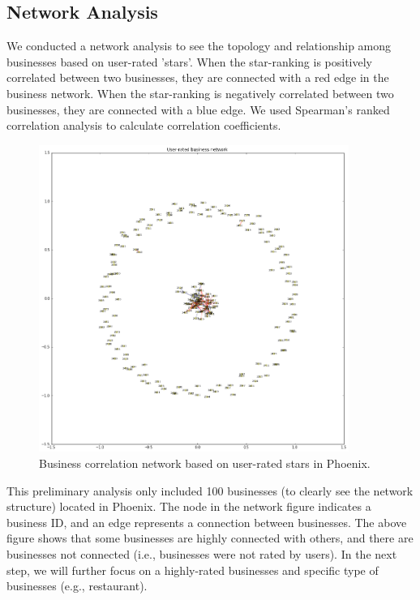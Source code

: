 \documentclass[11pt]{article}
\begin{document}
\subsection*{Network Analysis}
\par We conducted a network analysis to see the topology and relationship among businesses based on user-rated 'stars'. When the star-ranking is positively correlated between two businesses, they are connected with a red edge in the business network. When the star-ranking is negatively correlated between two businesses, they are connected with a blue edge. We used Spearman's ranked correlation analysis to calculate correlation coefficients.
\begin{figure}[H]
\centering
\includegraphics[width=0.9\textwidth]{./ac209/networkanalysis.png}
\caption{Business correlation network based on user-rated stars in Phoenix.}
\end{figure}
\par This preliminary analysis only included 100 businesses (to clearly see the network structure) located in Phoenix. The node in the network figure indicates a business ID, and an edge represents a connection between businesses. The above figure shows that some businesses are highly connected with others, and there are businesses not connected (i.e., businesses were not rated by users). In the next step, we will further focus on a highly-rated businesses and specific type of businesses (e.g., restaurant).
\end{document}

